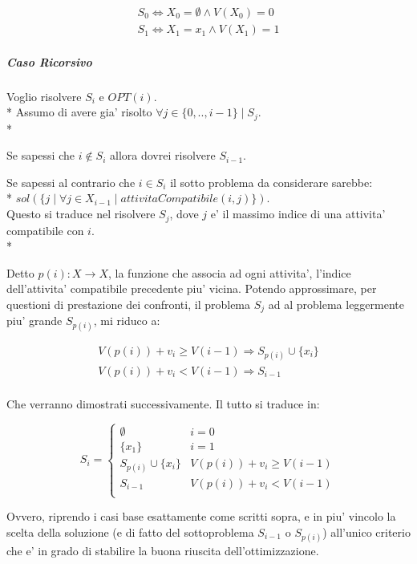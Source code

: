 \begin{align}
    \text{$S_0  \Leftrightarrow X_0 = \emptyset \land V(X_0) = 0$} \\
    \text{$S_1  \Leftrightarrow X_1 = {x_1} \land V(X_1) = 1$}
\end{align}

\subparagraph{Caso Ricorsivo}

Voglio risolvere $S_i$ e $OPT(i)$. \\*
Assumo di avere gia' risolto $\forall j \in \{0,..,i-1\} \mid S_j$. \\*

Se sapessi che $i \notin S_i$ allora dovrei risolvere $S_{i-1}$.

Se sapessi al contrario che $i \in S_i$ il sotto problema da considerare sarebbe: \\*
$sol(\{j \mid \forall j \in X_{i-1} \mid attivitaCompatibile(i, j)\})$. \\
Questo si traduce nel risolvere $S_j$, dove $j$ e' il massimo indice di una attivita' compatibile con $i$. \\*

Detto $p(i) : X \rightarrow X$, la funzione che associa ad ogni attivita', l'indice dell'attivita' compatibile precedente piu' vicina.
Potendo approssimare, per questioni di prestazione dei confronti, il problema $S_j$ ad al problema leggermente piu' grande $S_{p(i)}$, mi riduco a:

\begin{align}
    \text{$V(p(i)) + v_i \geq V(i-1) \Rightarrow S_{p(i)} \cup \{x_i\}$} \\
    \text{$V(p(i)) + v_i < V(i-1) \Rightarrow S_{i-1}$} \\
\end{align}

Che verranno dimostrati successivamente.
Il tutto si traduce in:

\[
    S_i =
    \begin{cases}
        \text{$\emptyset$} & \text{$i = 0$} \\
        \text{$\{x_1\}$} & \text{$i = 1$} \\
        \text{$S_{p(i)} \cup \{x_i\}$} & \text{$V(p(i)) + v_i \geq V(i-1)$} \\
        \text{$S_{i-1}$} & \text{$V(p(i)) + v_i < V(i-1)$} \\
    \end{cases}
\]

Ovvero, riprendo i casi base esattamente come scritti sopra, e in piu' vincolo la scelta della soluzione (e di fatto del sottoproblema $S_{i-1}$ o $S_{p(i)}$) all'unico criterio che e' in grado di stabilire la buona riuscita dell'ottimizzazione.

